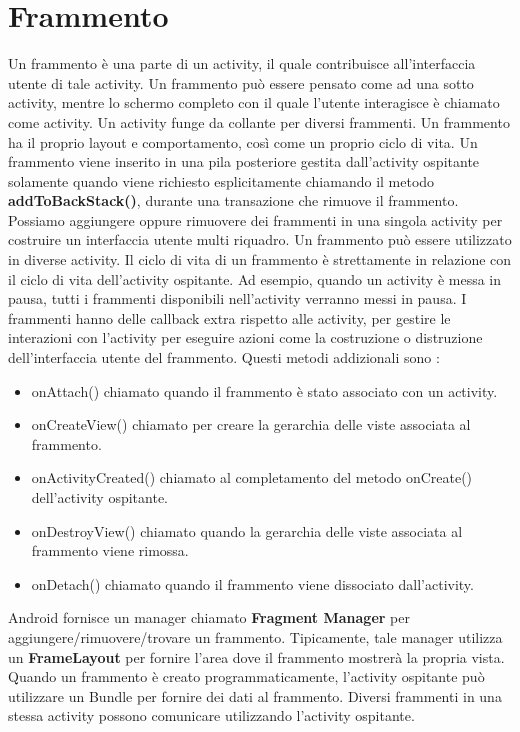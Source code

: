 \documentclass[12pt]{report}
\begin{document}
\section{Frammento}
Un frammento è una parte di un activity, il quale contribuisce all'interfaccia utente di tale activity. Un frammento può essere pensato come ad una sotto activity, mentre lo schermo completo con il quale l'utente interagisce è chiamato come activity. Un activity funge da collante per diversi frammenti. Un frammento ha il proprio layout e comportamento, così come un proprio ciclo di vita. Un frammento viene inserito in una pila posteriore gestita dall'activity ospitante solamente quando viene richiesto esplicitamente chiamando il metodo \textbf{addToBackStack()}, durante una transazione che rimuove il frammento. Possiamo aggiungere oppure rimuovere dei frammenti in una singola activity per costruire un interfaccia utente multi riquadro. Un frammento può essere utilizzato in diverse activity. Il ciclo di vita di un frammento è strettamente in relazione con il ciclo di vita dell'activity ospitante. Ad esempio, quando un activity è messa in pausa, tutti i frammenti disponibili nell'activity verranno messi in pausa. I frammenti hanno delle callback extra rispetto alle activity, per gestire le interazioni con l'activity per eseguire azioni come la costruzione o distruzione dell'interfaccia utente del frammento. Questi metodi addizionali sono :
\begin{itemize}
\item onAttach() chiamato quando il frammento è stato associato con un activity.
\item onCreateView() chiamato per creare la gerarchia delle viste associata al frammento.
\item onActivityCreated() chiamato al completamento del metodo onCreate() dell'activity ospitante.
\item onDestroyView() chiamato quando la gerarchia delle viste associata al frammento viene rimossa.
\item onDetach() chiamato quando il frammento viene dissociato dall'activity.
\end{itemize} 
Android fornisce un manager chiamato \textbf{Fragment Manager} per aggiungere/rimuovere/trovare un frammento. Tipicamente, tale manager utilizza un \textbf{FrameLayout} per fornire l'area dove il frammento mostrerà la propria vista. Quando un frammento è creato programmaticamente, l'activity ospitante può utilizzare un Bundle per fornire dei dati al frammento. Diversi frammenti in una stessa activity possono comunicare utilizzando l'activity ospitante.
\end{document}
